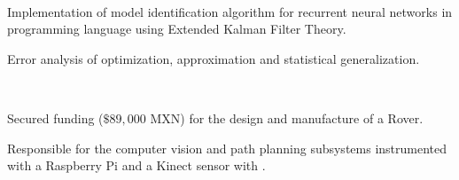 \documentclass[]{tex/deedy-resume-openfont}
\begin{document}
\begin{minipage}[t]{0.66\textwidth}
\\
\begin{tightemize}
    \item Implementation of model identification algorithm for recurrent neural networks in  programming language using Extended Kalman Filter Theory.
    \item Error analysis of optimization, approximation and statistical generalization. 
\end{tightemize}
\sectionsep

\\
\begin{tightemize}
    \item Secured funding ($\$89,000$ MXN) for the design and manufacture of a Rover.
    \item Responsible for the computer vision and path planning subsystems instrumented with a Raspberry Pi and a Kinect sensor with . 
\end{tightemize}


\end{minipage} 
\end{document}
